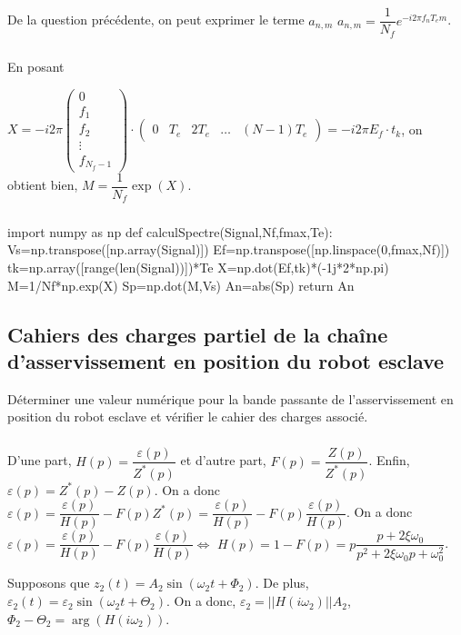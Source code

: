\documentclass[10pt,fleqn]{article} %
\begin{document}
\subparagraph{} %
De la question précédente, on peut exprimer le terme $a_{n,m}$ 
$a_{n,m}=\dfrac{1}{N_f}e^{-i2\pi f_{n}T_em}$.


\subparagraph{} %

En posant 

$
X=-i2\pi
\left(
\begin{array}{c}
0\\
f_1\\
f_2\\
\vdots\\
f_{N_f-1}
\end{array}
\right)
\cdot
\left(
\begin{array}{ccccc}
0& T_e & 2T_e &\ldots & (N-1)T_e
\end{array}
\right)
=-i2\pi E_f\cdot t_k
$, on obtient bien, $
M=\dfrac{1}{N_f}\exp(X)$.

\subparagraph{} %

\begin{python}
import numpy as np
def calculSpectre(Signal,Nf,fmax,Te):
    Vs=np.transpose([np.array(Signal)])
    Ef=np.transpose([np.linspace(0,fmax,Nf)])
    tk=np.array([range(len(Signal))])*Te
    X=np.dot(Ef,tk)*(-1j*2*np.pi)
    M=1/Nf*np.exp(X)
    Sp=np.dot(M,Vs)
    An=abs(Sp)
    return An
\end{python}

\subsection{Cahiers des charges partiel de la chaîne d'asservissement en position du robot esclave}

\begin{obj}
Déterminer une valeur numérique pour la bande passante de l’asservissement en position du robot
esclave et vérifier le cahier des charges associé.
\end{obj}

\subparagraph{}	

D'une part, $H(p)=\dfrac{\varepsilon (p)}{Z^*(p)}$ et d'autre part, $F(p)=\dfrac{Z (p)}{Z^*(p)}$. Enfin, $\varepsilon(p)=Z^*(p)-Z(p)$. On a donc $\varepsilon(p)=\dfrac{\varepsilon(p)}{H(p)} - F(p)Z^*(p)=\dfrac{\varepsilon(p)}{H(p)} - F(p)\dfrac{\varepsilon(p)}{H(p)}$. On a donc  $\varepsilon(p)=\dfrac{\varepsilon(p)}{H(p)} - F(p)\dfrac{\varepsilon(p)}{H(p)} \Leftrightarrow $ $H(p)=1 - F(p)= p\dfrac{p+2\xi\omega_0  }{p^2+2\xi\omega_0 p + \omega_0^2}$.

\vspace{1cm}
Supposons que  $z_2(t)=A_2\sin \left(\omega_2 t + \Phi_2 \right)$. De plus, $\varepsilon_2(t)=\varepsilon_2 \sin \left( \omega_2 t + \Theta_2 \right)$. On a donc, $\varepsilon_2 = || H\left( i\omega_2\right)|| A_2$, $\Phi_2 - \Theta_2 = \arg \left(H\left(i\omega_2\right)\right)$.
\end{document}

